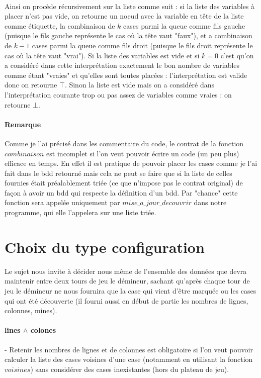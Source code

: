 \documentclass{report}
\begin{document}
	\paragraph{}
	Ainsi on procède récursivement sur la liste comme suit : si la liste des variables à placer n'est pas vide, on retourne un noeud avec la variable en tête de la liste comme étiquette, la combinaison de $k$ cases parmi la queue comme fils gauche (puisque le fils gauche représente le cas où la tête vaut "faux"), et a combinaison de $k-1$ cases parmi la queue comme fils droit (puisque le fils droit représente le cas où la tête vaut "vrai"). Si la liste des variables est vide et si $k = 0$ c'est qu'on a considéré dans cette interprétation exactement le bon nombre de variables comme étant "vraies" et qu'elles sont toutes placées : l'interprétation est valide donc on retourne $\top$. Sinon la liste est vide mais on a considéré dans l'interprétation courante trop ou pas assez de variables comme vraies : on retourne $\bot$.
	\paragraph{Remarque}
	Comme je l'ai précisé dans les commentaire du code, le contrat de la fonction $combinaison$ est incomplet si l'on veut pouvoir écrire un code (un peu plus) efficace en temps. En effet il est pratique de pouvoir placer les cases comme je l'ai fait dans le bdd retourné mais cela ne peut se faire que si la liste de celles fournies était préalablement triée (ce que n'impose pas le contrat original) de façon à avoir un bdd qui respecte la définition d'un bdd. Par "chance" cette fonction sera appelée uniquement par $mise\_a\_jour\_decouvrir$ dans notre programme, qui elle l'appelera sur une liste triée.

\section{Choix du type configuration}
	Le sujet nous invite à décider nous m\^eme de l'ensemble des données que devra maintenir entre deux tours de jeu le démineur, sachant qu'après chaque tour de jeu le démineur ne nous fournira que la case qui vient d'être marquée ou les cases qui ont été découverte (il fourni aussi en début de partie les nombres de lignes, colonnes, mines).
	\paragraph{lines $\wedge$ colones}
	- Retenir les nombres de lignes et de colonnes est obligatoire si l'on veut pouvoir calculer la liste des cases voisines d'une case (notamment en utilisant la fonction $voisines$) sans considérer des cases inexistantes (hors du plateau de jeu).
\end{document}
